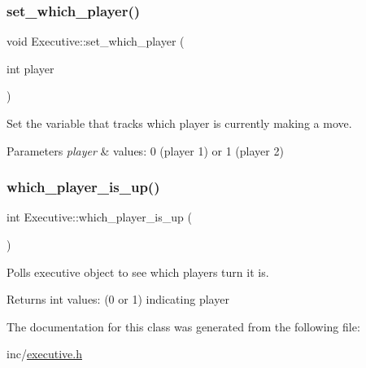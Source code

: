 \subsubsection{\texorpdfstring{set\_which\_player()}{set\_which\_player()}}
{\footnotesize\ttfamily void Executive\+::set\+\_\+which\+\_\+player (\begin{DoxyParamCaption}\item[{int}]{player }\end{DoxyParamCaption})}



Set the variable that tracks which player is currently making a move. 


\begin{DoxyParams}{Parameters}
{\em player} & values\+: 0 (player 1) or 1 (player 2) \\
\hline
\end{DoxyParams}
\mbox{\label{classExecutive_af910b08a89311aeb591440a58a6338f0}} 
\subsubsection{\texorpdfstring{which\_player\_is\_up()}{which\_player\_is\_up()}}
{\footnotesize\ttfamily int Executive\+::which\+\_\+player\+\_\+is\+\_\+up (\begin{DoxyParamCaption}{ }\end{DoxyParamCaption})}



Polls executive object to see which player\textquotesingle{}s turn it is. 

\begin{DoxyReturn}{Returns}
int values\+: (0 or 1) indicating player 
\end{DoxyReturn}


The documentation for this class was generated from the following file\+:\begin{DoxyCompactItemize}
\item 
inc/\mbox{\hyperlink{executive_8h}{executive.\+h}}\end{DoxyCompactItemize}
